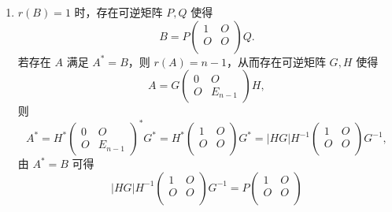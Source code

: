 \begin{enumerate}
\begin{enumerate}
\begin{enumerate}
                        \item $r(B) = 1$ 时，存在可逆矩阵 $P, Q$ 使得
                              \[B = P\begin{pmatrix}
                                      1 & O \\
                                      O & O \\
                                  \end{pmatrix}Q.\]
                              若存在 $A$ 满足 $A^{*} = B$，则 $r(A) = n-1$，从而存在可逆矩阵 $G, H$ 使得
                              \[A = G\begin{pmatrix}
                                      0 & O       \\
                                      O & E_{n-1}
                                  \end{pmatrix}H,\]
                              则
                              \[A^* = H^*\begin{pmatrix}
                                      0 & O       \\
                                      O & E_{n-1}
                                  \end{pmatrix}^*G^* = H^*\begin{pmatrix}
                                      1 & O \\
                                      O & O \\
                                  \end{pmatrix}G^* = \lvert HG \rvert H^{-1}\begin{pmatrix}
                                      1 & O \\
                                      O & O \\
                                  \end{pmatrix}G^{-1},\]
                              由 $A^* = B$ 可得
                              \[\lvert HG \rvert H^{-1}\begin{pmatrix}
                                      1 & O \\
                                      O & O \\
                                  \end{pmatrix}G^{-1} = P\begin{pmatrix}
                                      1 & O \\
                                      O & O \\

\end{pmatrix}\]
\end{enumerate}
\end{enumerate}
\end{enumerate}
